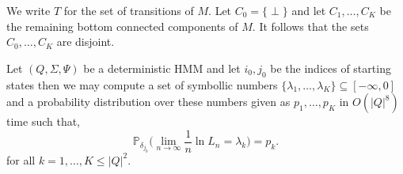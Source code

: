 \documentclass[a4paper,UKenglish,cleveref, autoref,mathscr]{lipics-v2019}
\newcommand{\PP}{\mathbb{P}}
\newcommand{\1}{\mathbbm{1}}
\newcommand{\liexp}{\lim_{n\rightarrow\infty} \frac1n \ln L_n}
\begin{document}
We write $T$ for the set of transitions of $M$. Let $C_0 = \{\perp\}$ and let $C_1, \dots, C_K$ be the remaining bottom connected components of $M$. It follows that the sets $C_0, \dots, C_K$ are disjoint.

\begin{theorem}
Let $(Q, \Sigma, \Psi)$ be a deterministic HMM and let $i_0, j_0$ be the indices of starting states then we may compute a set of symbollic numbers $\{ \lambda_1, \dots, \lambda_K \} \subseteq [-\infty, 0]$ and a probability distribution over these numbers given as $p_1, \dots, p_K$ in $O(|Q|^8)$ time such that, 
\begin{equation*}
\PP_{\delta_{j_0}} \Big( \liexp = \lambda_k \Big) = p_k.
\end{equation*}
for all $k = 1, \dots, K \leq |Q|^2$.
\end{theorem}
\end{document}
